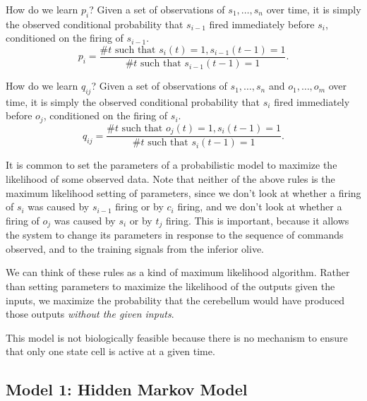 \documentclass{article}
\theoremstyle{definition}
\begin{document}
How do we learn $p_i$? Given a set of observations of $s_1, \dots,
s_n$ over time, it is simply the observed conditional probability that
$s_{i-1}$ fired immediately before $s_i$, conditioned on the firing of
$s_{i-1}$.
$$p_i = \frac{\mbox{\# $t$ such that $s_i(t)=1, s_{i-1}(t-1)=1$}}
{\mbox{\# $t$ such that $s_{i-1}(t-1)=1$}}.$$

How do we learn $q_{ij}$? Given a set of observations of $s_1, \dots,
s_n$ and $o_1, \dots, o_m$ over time, it is simply the observed
conditional probability that $s_i$ fired immediately before $o_j$,
conditioned on the firing of $s_i$.
$$q_{ij} = \frac{\mbox{\# $t$ such that $o_j(t)=1, s_i(t-1)=1$}}
{\mbox{\# $t$ such that $s_i(t-1)=1$}}.$$

It is common to set the parameters of a probabilistic model to
maximize the likelihood of some observed data.  Note that neither of
the above rules is the maximum likelihood setting of parameters, since
we don't look at whether a firing of $s_i$ was caused by $s_{i-1}$
firing or by $c_i$ firing, and we don't look at whether a firing of
$o_j$ was caused by $s_i$ or by $t_j$ firing. This is important,
because it allows the system to change its parameters in response to
the sequence of commands observed, and to the training signals from
the inferior olive. 

We can think of these rules as a kind of maximum likelihood
algorithm. Rather than setting parameters to maximize the likelihood
of the outputs given the inputs, we maximize the probability that the
cerebellum would have produced those outputs {\em without the given
  inputs}.

This model is not biologically feasible because there is no mechanism
to ensure that only one state cell is active at a given time.

\subsection{Model 1: Hidden Markov Model}
\end{document}
